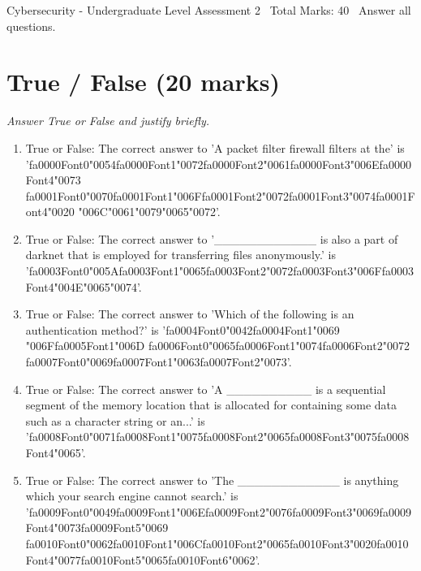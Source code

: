\documentclass[12pt]{article}
\begin{document}
\begin{center}
Cybersecurity - Undergraduate Level Assessment 2 \
Total Marks: 40 \
Answer all questions.
\end{center}

\section*{True / False (20 marks)}
\textit{Answer True or False and justify briefly.}
\begin{enumerate}[label=\arabic*.]
\item True or False: The correct answer to 'A packet filter firewall filters at the' is '{\csname fa0000Font0\endcsname\char"0054}{\csname fa0000Font1\endcsname\char"0072}{\csname fa0000Font2\endcsname\char"0061}{\csname fa0000Font3\endcsname\char"006E}{\csname fa0000Font4\endcsname\char"0073} {\csname fa0001Font0\endcsname\char"0070}{\csname fa0001Font1\endcsname\char"006F}{\csname fa0001Font2\endcsname\char"0072}{\csname fa0001Font3\endcsname\char"0074}{\csname fa0001Font4\endcsname\char"0020} {\char"006C}{\char"0061}{\char"0079}{\char"0065}{\char"0072}'.
\item True or False: The correct answer to '\_\_\_\_\_\_\_\_\_\_\_\_ is also a part of darknet that is employed for transferring files anonymously.' is '{\csname fa0003Font0\endcsname\char"005A}{\csname fa0003Font1\endcsname\char"0065}{\csname fa0003Font2\endcsname\char"0072}{\csname fa0003Font3\endcsname\char"006F}{\csname fa0003Font4\endcsname\char"004E}{\char"0065}{\char"0074}'.
\item True or False: The correct answer to 'Which of the following is an authentication method?' is '{\csname fa0004Font0\endcsname\char"0042}{\csname fa0004Font1\endcsname\char"0069} {\char"006F}{\csname fa0005Font1\endcsname\char"006D} {\csname fa0006Font0\endcsname\char"0065}{\csname fa0006Font1\endcsname\char"0074}{\csname fa0006Font2\endcsname\char"0072} {\csname fa0007Font0\endcsname\char"0069}{\csname fa0007Font1\endcsname\char"0063}{\csname fa0007Font2\endcsname\char"0073}'.
\item True or False: The correct answer to 'A \_\_\_\_\_\_\_\_\_\_ is a sequential segment of the memory location that is allocated for containing some data such as a character string or an...' is '{\csname fa0008Font0\endcsname\char"0071}{\csname fa0008Font1\endcsname\char"0075}{\csname fa0008Font2\endcsname\char"0065}{\csname fa0008Font3\endcsname\char"0075}{\csname fa0008Font4\endcsname\char"0065}'.
\item True or False: The correct answer to 'The \_\_\_\_\_\_\_\_\_\_\_\_ is anything which your search engine cannot search.' is '{\csname fa0009Font0\endcsname\char"0049}{\csname fa0009Font1\endcsname\char"006E}{\csname fa0009Font2\endcsname\char"0076}{\csname fa0009Font3\endcsname\char"0069}{\csname fa0009Font4\endcsname\char"0073}{\csname fa0009Font5\endcsname\char"0069} {\csname fa0010Font0\endcsname\char"0062}{\csname fa0010Font1\endcsname\char"006C}{\csname fa0010Font2\endcsname\char"0065}{\csname fa0010Font3\endcsname\char"0020}{\csname fa0010Font4\endcsname\char"0077}{\csname fa0010Font5\endcsname\char"0065}{\csname fa0010Font6\endcsname\char"0062}'.

\end{enumerate}
\end{document}
